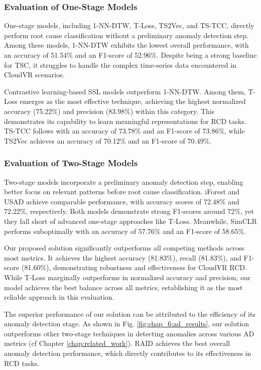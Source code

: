 
\subsubsection{Evaluation of One-Stage Models}
One-stage models, including 1-NN-DTW, T-Loss, TS2Vec, and TS-TCC, directly perform root cause classification without a preliminary anomaly detection step. Among these models, 1-NN-DTW exhibits the lowest overall performance, with an accuracy of 51.54\% and an F1-score of 52.96\%. Despite being a strong baseline for TSC, it struggles to handle the complex time-series data encountered in CloudVR scenarios.

Contrastive learning-based SSL models outperform 1-NN-DTW. Among them, T-Loss emerges as the most effective technique, achieving the highest normalized accuracy (75.22\%) and precision (83.98\%) within this category. This demonstrates its capability to learn meaningful representations for RCD tasks. TS-TCC follows with an accuracy of 73.78\% and an F1-score of 73.86\%, while TS2Vec achieves an accuracy of 70.12\% and an F1-score of 70.49\%.

\subsubsection{Evaluation of Two-Stage Models}
Two-stage models incorporate a preliminary anomaly detection step, enabling better focus on relevant patterns before root cause classification. iForest and USAD achieve comparable performance, with accuracy scores of 72.48\% and 72.22\%, respectively. Both models demonstrate strong F1-scores around 72\%, yet they fall short of advanced one-stage approaches like T-Loss. Meanwhile, SimCLR performs suboptimally with an accuracy of 57.76\% and an F1-score of 58.65\%.

Our proposed solution significantly outperforms all competing methods across most metrics. It achieves the highest accuracy (81.83\%), recall (81.83\%), and F1-score (81.60\%), demonstrating robustness and effectiveness for CloudVR RCD. While T-Loss marginally outperforms in normalized accuracy and precision, our model achieves the best balance across all metrics, establishing it as the most reliable approach in this evaluation.

The superior performance of our solution can be attributed to the efficiency of its anomaly detection stage. As shown in Fig. \ref{fig:chap_6:ad_results}, our solution outperforms other two-stage techniques in detecting anomalies across various AD metrics (cf Chapter \ref{chap:related_work}). RAID achieves the best overall anomaly detection performance, which directly contributes to its effectiveness in RCD tasks.


